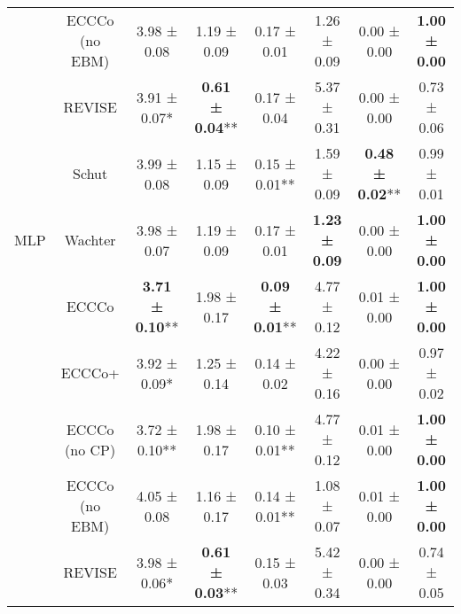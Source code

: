 \begin{table}
{\begin{tabular}[t]{cccccccc}
 & ECCCo (no EBM) & 3.98 ± 0.08\hphantom{*}\hphantom{*} & 1.19 ± 0.09\hphantom{*}\hphantom{*} & 0.17 ± 0.01\hphantom{*}\hphantom{*} & 1.26 ± 0.09\hphantom{*}\hphantom{*} & 0.00 ± 0.00\hphantom{*}\hphantom{*} & \textbf{1.00 ± 0.00}\hphantom{*}\hphantom{*}\\

 & REVISE & 3.91 ± 0.07*\hphantom{*} & \textbf{0.61 ± 0.04}** & 0.17 ± 0.04\hphantom{*}\hphantom{*} & 5.37 ± 0.31\hphantom{*}\hphantom{*} & 0.00 ± 0.00\hphantom{*}\hphantom{*} & 0.73 ± 0.06\hphantom{*}\hphantom{*}\\

 & Schut & 3.99 ± 0.08\hphantom{*}\hphantom{*} & 1.15 ± 0.09\hphantom{*}\hphantom{*} & 0.15 ± 0.01** & 1.59 ± 0.09\hphantom{*}\hphantom{*} & \textbf{0.48 ± 0.02}** & 0.99 ± 0.01\hphantom{*}\hphantom{*}\\

\multirow[t]{-7}{*}{\centering\arraybackslash MLP} & Wachter & 3.98 ± 0.07\hphantom{*}\hphantom{*} & 1.19 ± 0.09\hphantom{*}\hphantom{*} & 0.17 ± 0.01\hphantom{*}\hphantom{*} & \textbf{1.23 ± 0.09}\hphantom{*}\hphantom{*} & 0.00 ± 0.00\hphantom{*}\hphantom{*} & \textbf{1.00 ± 0.00}\hphantom{*}\hphantom{*}\\
\cmidrule{1-8}
 & ECCCo & \textbf{3.71 ± 0.10}** & 1.98 ± 0.17\hphantom{*}\hphantom{*} & \textbf{0.09 ± 0.01}** & 4.77 ± 0.12\hphantom{*}\hphantom{*} & 0.01 ± 0.00\hphantom{*}\hphantom{*} & \textbf{1.00 ± 0.00}\hphantom{*}\hphantom{*}\\

 & ECCCo+ & 3.92 ± 0.09*\hphantom{*} & 1.25 ± 0.14\hphantom{*}\hphantom{*} & 0.14 ± 0.02\hphantom{*}\hphantom{*} & 4.22 ± 0.16\hphantom{*}\hphantom{*} & 0.00 ± 0.00\hphantom{*}\hphantom{*} & 0.97 ± 0.02\hphantom{*}\hphantom{*}\\

 & ECCCo (no CP) & 3.72 ± 0.10** & 1.98 ± 0.17\hphantom{*}\hphantom{*} & 0.10 ± 0.01** & 4.77 ± 0.12\hphantom{*}\hphantom{*} & 0.01 ± 0.00\hphantom{*}\hphantom{*} & \textbf{1.00 ± 0.00}\hphantom{*}\hphantom{*}\\

 & ECCCo (no EBM) & 4.05 ± 0.08\hphantom{*}\hphantom{*} & 1.16 ± 0.17\hphantom{*}\hphantom{*} & 0.14 ± 0.01** & 1.08 ± 0.07\hphantom{*}\hphantom{*} & 0.01 ± 0.00\hphantom{*}\hphantom{*} & \textbf{1.00 ± 0.00}\hphantom{*}\hphantom{*}\\

 & REVISE & 3.98 ± 0.06*\hphantom{*} & \textbf{0.61 ± 0.03}** & 0.15 ± 0.03\hphantom{*}\hphantom{*} & 5.42 ± 0.34\hphantom{*}\hphantom{*} & 0.00 ± 0.00\hphantom{*}\hphantom{*} & 0.74 ± 0.05\hphantom{*}\hphantom{*}\\


\end{tabular}}
\end{table}
